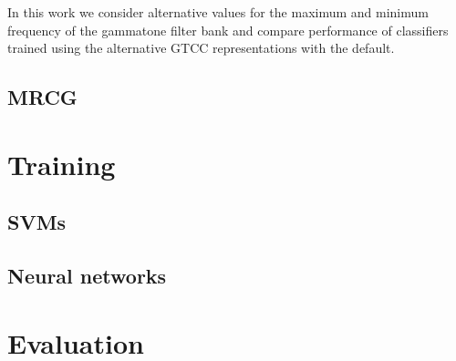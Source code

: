 In this work we consider alternative values for the maximum and minimum
frequency of the gammatone filter bank and compare performance of classifiers
trained using the alternative GTCC representations with the default.

\subsection{MRCG}

\section{Training}

\subsection{SVMs}

\subsection{Neural networks}

\section{Evaluation}
